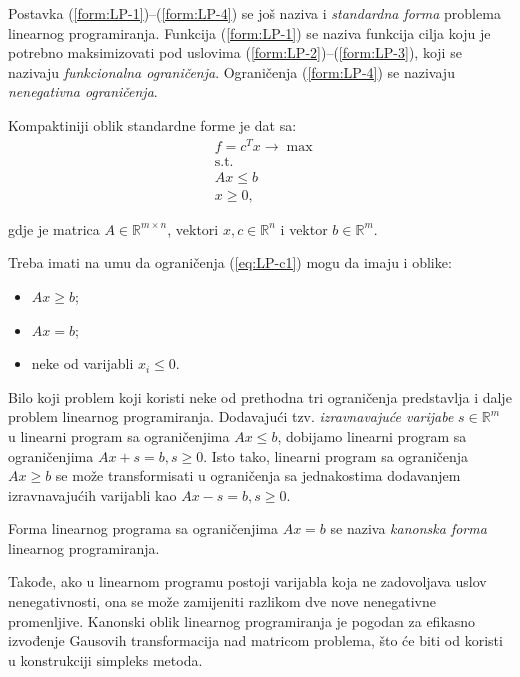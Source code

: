 \documentclass[a4paper, utf8, 11pt, colorlinks]{book}
\begin{document}
Postavka (\ref{form:LP-1})--(\ref{form:LP-4}) se još naziva i \emph{standardna forma} problema linearnog programiranja. Funkcija (\ref{form:LP-1}) se naziva funkcija cilja koju je potrebno maksimizovati pod uslovima (\ref{form:LP-2})--(\ref{form:LP-3}), koji se nazivaju \emph{funkcionalna ograničenja}. Ograničenja (\ref{form:LP-4}) se nazivaju \emph{nenegativna ograničenja}. 

Kompaktiniji oblik standardne forme je dat sa:
\begin{align}
    & f = c^T x \rightarrow \max \label{eq:LP-o1}\\
    & \mbox{s.t.} \nonumber \\
    &  A x \leq b \label{eq:LP-c1} \\
    & x \geq 0 \label{eq:LP-c2},
\end{align}

gdje je matrica $A \in \mathbb{R}^{m \times n}$, vektori  $x,c \in \mathbb{R}^n$ i vektor $b \in \mathbb{R}^{m}$.

Treba imati na umu da ograničenja (\ref{eq:LP-c1}) mogu da imaju i oblike:
\begin{itemize}
    \item $Ax \geq b$;
    \item $Ax = b$;
    \item neke od varijabli $x_i\leqslant 0$.
\end{itemize}
Bilo koji problem koji koristi neke od prethodna tri ograničenja predstavlja i dalje problem linearnog programiranja. Dodavajući tzv. \emph{izravnavajuće varijabe} $s \in \mathbb{R}^m$ u linearni program sa ograničenjima $Ax \leq b$, dobijamo linearni program sa ograničenjima $Ax + s = b, s \geq 0$. Isto tako, linearni program sa ograničenja $Ax \geq b$ se može transformisati u ograničenja sa jednakostima dodavanjem izravnavajućih varijabli kao $Ax - s = b, s\geq 0$.

 Forma linearnog programa sa ograničenjima $Ax = b$ se naziva \emph{kanonska forma} linearnog programiranja. 
 
 Takođe, ako u linearnom
programu postoji varijabla koja ne zadovoljava uslov nenegativnosti, ona se može zamijeniti razlikom dve nove nenegativne promenljive. Kanonski oblik linearnog programiranja je pogodan za efikasno izvođenje Gausovih transformacija  nad matricom problema, što će biti od koristi u konstrukciji simpleks metoda.   %
\end{document}
